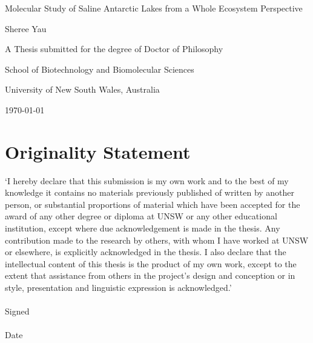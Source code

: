 \documentclass[11pt,a4paper,twoside,openright]{report}
\begin{document}

\begin{titlepage}
\begin{center}
\vspace*{1in}
\LARGE {Molecular Study of Saline Antarctic Lakes from a Whole Ecosystem Perspective}
\par
\vspace{1.5in}
\large {Sheree Yau}
\par
\vfill
A Thesis submitted for the degree of Doctor of Philosophy
\par
\vspace{0.5in}
School of Biotechnology and Biomolecular Sciences
\par
\vspace{0.5in}
University of New South Wales, Australia
\par
\vspace{0.5in}
\today
\end{center}
\end{titlepage}




\chapter*{Originality Statement}
`I hereby declare that this submission is my own work and to the best of my knowledge it contains
 no materials previously published of written by another person, or substantial proportions of 
material which have been accepted for the award of any other degree or diploma at UNSW or any other
 educational institution, except where due acknowledgement is made in the thesis. Any contribution 
made to the research by others, with whom I have worked at UNSW or elsewhere, is explicitly 
acknowledged in the thesis. I also declare that the intellectual content of this thesis is the product
 of my own work, except to the extent that assistance from others in the project's design and 
conception or in style, presentation and linguistic expression is acknowledged.'\\\\
Signed \dotfill\\\\
Date \dotfill
\end{document}
